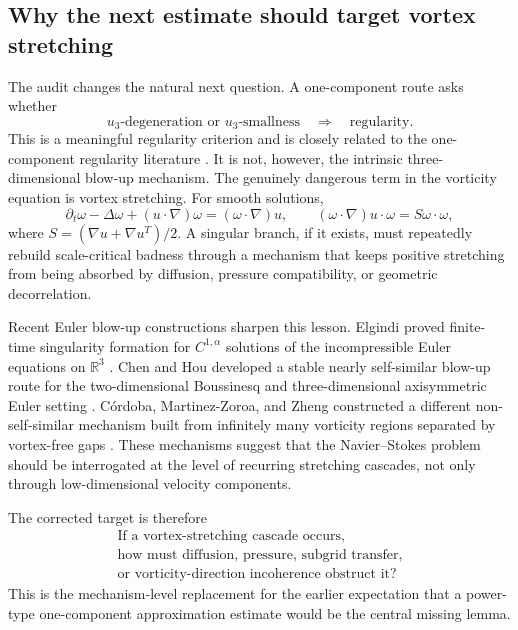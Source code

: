 \documentclass[11pt]{article}
\numberwithin{equation}{section}
\theoremstyle{remark}
\newcommand{\R}{\mathbb R}
\begin{document}
\subsection{Why the next estimate should target vortex stretching}

The audit changes the natural next question. A one-component route asks whether
\[
u_3\text{-degeneration or }u_3\text{-smallness}
\quad\Longrightarrow\quad
\text{regularity}.
\]
This is a meaningful regularity criterion and is closely related to the one-component regularity literature \cite{KukavicaZiane2006,CheminZhang2016,HanLeiLiZhao2019,BarkerPrange2021}. It is not, however, the intrinsic three-dimensional blow-up mechanism. The genuinely dangerous term in the vorticity equation is vortex stretching. For smooth solutions,
\[
\partial_t\omega-\Delta\omega+(u\cdot\nabla)\omega
=(\omega\cdot\nabla)u,
\qquad
(\omega\cdot\nabla)u\cdot\omega=S\omega\cdot\omega,
\]
where $S=(\nabla u+\nabla u^T)/2$. A singular branch, if it exists, must repeatedly rebuild scale-critical badness through a mechanism that keeps positive stretching from being absorbed by diffusion, pressure compatibility, or geometric decorrelation.

Recent Euler blow-up constructions sharpen this lesson. Elgindi proved finite-time singularity formation for $C^{1,\alpha}$ solutions of the incompressible Euler equations on $\R^3$ \cite{Elgindi2021}. Chen and Hou developed a stable nearly self-similar blow-up route for the two-dimensional Boussinesq and three-dimensional axisymmetric Euler setting \cite{ChenHou2023Analysis,ChenHou2023Numerics}. C\'ordoba, Martinez-Zoroa, and Zheng constructed a different non-self-similar mechanism built from infinitely many vorticity regions separated by vortex-free gaps \cite{CMZZ2025}. These mechanisms suggest that the Navier--Stokes problem should be interrogated at the level of recurring stretching cascades, not only through low-dimensional velocity components.

The corrected target is therefore
\begin{equation}\label{eq:corrected-target}
\boxed{
\begin{gathered}
\text{If a vortex-stretching cascade occurs,}\\
\text{how must diffusion, pressure, subgrid transfer,}\\
\text{or vorticity-direction incoherence obstruct it?}
\end{gathered}}
\end{equation}
This is the mechanism-level replacement for the earlier expectation that a power-type one-component approximation estimate would be the central missing lemma.
\end{document}
